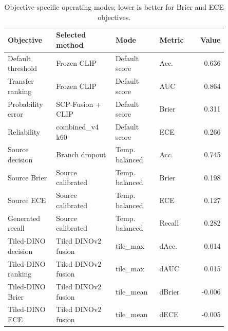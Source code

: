 \begin{table}[t]
\centering
\small
\caption{Objective-specific operating modes; lower is better for Brier and ECE objectives.}
\label{tab:calibration-operating-modes}
\begin{tabular}{p{0.22\linewidth} p{0.27\linewidth} p{0.20\linewidth} p{0.16\linewidth} r}
\toprule
Objective & Selected method & Mode & Metric & Value \\
\midrule
Default threshold & Frozen CLIP & Default score & Acc. & 0.636 \\
Transfer ranking & Frozen CLIP & Default score & AUC & 0.864 \\
Probability error & SCP-Fusion + CLIP & Default score & Brier & 0.311 \\
Reliability & combined\_v4 k60 & Default score & ECE & 0.266 \\
Source decision & Branch dropout & Temp. balanced & Acc. & 0.745 \\
Source Brier & Source calibrated & Temp. balanced & Brier & 0.198 \\
Source ECE & Source calibrated & Temp. balanced & ECE & 0.127 \\
Generated recall & Source calibrated & Temp. balanced & Recall & 0.282 \\
Tiled-DINO decision & Tiled DINOv2 fusion & tile\_max & dAcc. & 0.014 \\
Tiled-DINO ranking & Tiled DINOv2 fusion & tile\_max & dAUC & 0.015 \\
Tiled-DINO Brier & Tiled DINOv2 fusion & tile\_mean & dBrier & -0.006 \\
Tiled-DINO ECE & Tiled DINOv2 fusion & tile\_mean & dECE & -0.005 \\
\bottomrule
\end{tabular}
\end{table}
